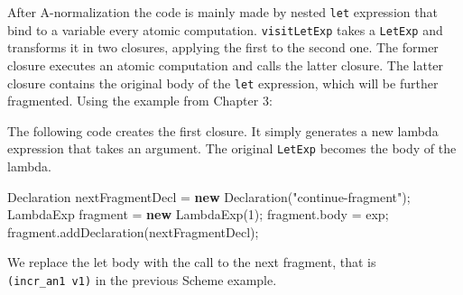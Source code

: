 \documentclass[12pt,a4paper,oneside,openright]{book}
\newenvironment{Shaded}{\begin{snugshade}}{\end{snugshade}}
\newcommand{\KeywordTok}[1]{\textcolor[rgb]{0.13,0.29,0.53}{\textbf{{#1}}}}
\newcommand{\DecValTok}[1]{\textcolor[rgb]{0.00,0.00,0.81}{{#1}}}
\newcommand{\StringTok}[1]{\textcolor[rgb]{0.31,0.60,0.02}{{#1}}}
\newcommand{\CommentTok}[1]{\textcolor[rgb]{0.56,0.35,0.01}{\textit{{#1}}}}
\newcommand{\FunctionTok}[1]{\textcolor[rgb]{0.00,0.00,0.00}{{#1}}}
\newcommand{\NormalTok}[1]{{#1}}
\begin{document}
After A-normalization the code is mainly made by nested \texttt{let}
expression that bind to a variable every atomic computation.
\texttt{visitLetExp} takes a \texttt{LetExp} and transforms it in two
closures, applying the first to the second one. The former closure
executes an atomic computation and calls the latter closure. The latter
closure contains the original body of the \texttt{let} expression, which
will be further fragmented. Using the example from Chapter 3:

\begin{Shaded}
\end{Shaded}

The following code creates the first closure. It simply generates a new
lambda expression that takes an argument. The original \texttt{LetExp}
becomes the body of the lambda.

\begin{Shaded}
\begin{Highlighting}[]
\NormalTok{Declaration nextFragmentDecl = }\KeywordTok{new} \FunctionTok{Declaration}\NormalTok{(}\StringTok{"continue-fragment"}\NormalTok{);}
\NormalTok{LambdaExp fragment = }\KeywordTok{new} \FunctionTok{LambdaExp}\NormalTok{(}\DecValTok{1}\NormalTok{);}
\NormalTok{fragment.}\FunctionTok{body} \NormalTok{= exp;}
\NormalTok{fragment.}\FunctionTok{addDeclaration}\NormalTok{(nextFragmentDecl);}
\end{Highlighting}
\end{Shaded}

We replace the let body with the call to the next fragment, that is
\texttt{(incr\_an1\ v1)} in the previous Scheme example.
\end{document}
